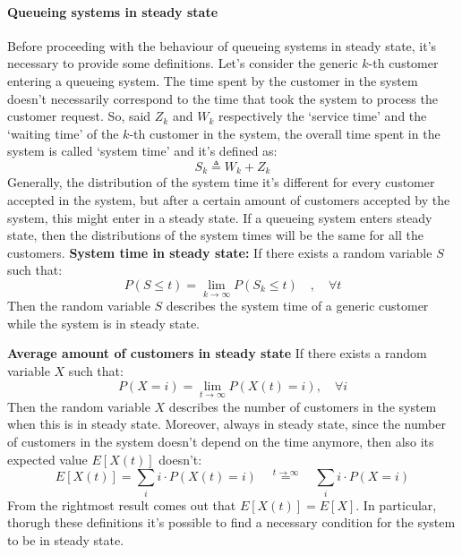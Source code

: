 \documentclass[12pt,a4paper]{article}
\begin{document}
\paragraph{Queueing systems in steady state}
Before proceeding with the behaviour of queueing systems in steady state, it's necessary to provide some definitions. Let's consider the generic $k$-th customer entering a queueing system. The time spent by the customer in the system doesn't necessarily correspond to the time that took the system to process the customer request. So, said $Z_k$ and $W_k$ respectively the `service time' and the `waiting time' of the $k$-th customer in the system, the overall time spent in the system is called `system time' and it's defined as:
$$
S_k \triangleq W_k+Z_k
$$ 
Generally, the distribution of the system time it's different for every customer accepted in the system, but after a certain amount of customers accepted by the system, this might enter in a steady state. If a queueing system enters steady state, then the distributions of the system times will be the same for all the customers.
\newpage
\noindent
\textbf{System time in steady state: }
If there exists a random variable $S$ such that:
$$
P\left( S\leq t\right)
=\lim_{k\rightarrow \infty}
{P\left( S_k\leq t\right)}
\quad,\quad
\forall t
$$
Then the random variable $S$ describes the system time of a generic customer while the system is in steady state.

\bigskip
\noindent
\textbf{Average amount of customers in steady state } If there exists a random variable $X$ such that:
\begin{equation*}
P(X = i) = \lim_{t\rightarrow \infty} P(X(t) = i), \quad \forall i
\end{equation*}
Then the random variable $X$ describes the number of customers in the system when this is in steady state. Moreover, always in steady state, since the number of customers in the system doesn't depend on the time anymore, then also its expected value $E\left[X(t)\right]$ doesn't:
$$
E\left[X(t)\right]
=
\sum_{i}
{
i \cdot P\left(X(t)=i\right)
}
\quad
\overset{t\rightarrow \infty}{=}\quad
\sum_{i}
{
i \cdot P\left(X=i\right)
}
$$
From the rightmost result comes out that $E\left[X(t)\right]=E\left[X\right]$.
In particular, thorugh these definitions it's possible to find a necessary condition for the system to be in steady state.
\end{document}
